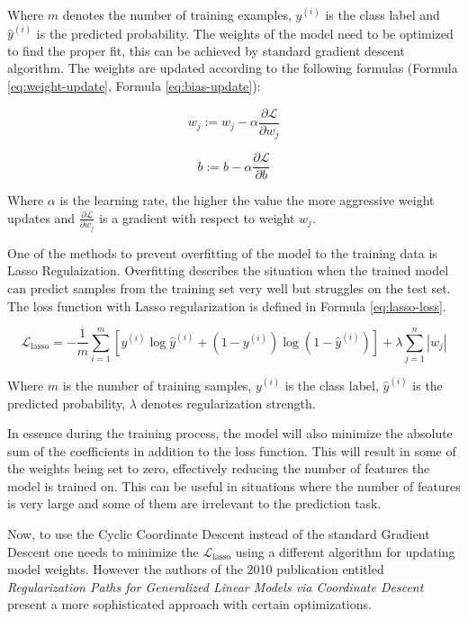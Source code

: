 \documentclass[12pt]{article}
\begin{document}
Where $m$ denotes the number of training examples, $y^{(i)}$ is the class label and $\hat{y}^{(i)}$ is the predicted probability. The weights of the model need to be optimized to find the proper fit, this can be achieved by standard gradient descent algorithm. The weights are updated according to the following formulas (Formula \ref{eq:weight-update}, Formula \ref{eq:bias-update}):


\begin{equation}\label{eq:weight-update}
    w_j := w_j - \alpha \frac{\partial \mathcal{L}}{\partial w_j}
\end{equation}

\begin{equation}\label{eq:bias-update}
    b := b - \alpha \frac{\partial \mathcal{L}}{\partial b}
\end{equation}

Where $\alpha$ is the learning rate, the higher the value the more aggressive weight updates and $\frac{\partial \mathcal{L}}{\partial w_j}$ is a gradient with respect to weight $w_j$.


One of the methods to prevent overfitting of the model to the training data is Lasso Regulaization. Overfitting describes the situation when the trained model can predict samples from the training set very well but struggles on the test set. The loss function with Lasso regularization is defined in Formula \ref{eq:lasso-loss}.

\begin{equation}\label{eq:lasso-loss}
\mathcal{L}_{\text{lasso}} = -\frac{1}{m} \sum_{i=1}^{m} \left[ y^{(i)} \log \hat{y}^{(i)} + \left(1 - y^{(i)}\right) \log \left(1 - \hat{y}^{(i)}\right) \right] + \lambda \sum_{j=1}^{n} |w_j|
\end{equation}

Where $m$ is the number of training samples, $y^{(i)}$ is the class label, $\hat{y}^{(i)}$ is the predicted probability, $\lambda$ denotes regularization strength.

In essence during the training process, the model will also minimize the absolute sum of the coefficients in addition to the loss function. This will result in some of the weights being set to zero, effectively reducing the number of features the model is trained on. This can be useful in situations where the number of features is very large and some of them are irrelevant to the prediction task.

Now, to use the Cyclic Coordinate Descent instead of the standard Gradient Descent one needs to minimize the $\mathcal{L}_{\text{lasso}}$ using a different algorithm for updating model weights. However the authors of the 2010 publication entitled \textit{Regularization Paths for Generalized Linear Models via Coordinate Descent} \cite{Friedman2010} present a more sophisticated approach with certain optimizations.
\end{document}
